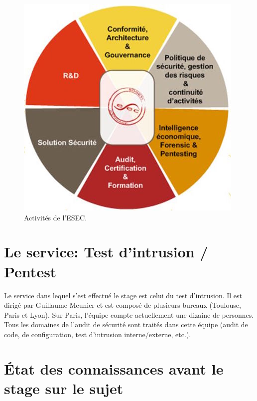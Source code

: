 \begin{figure}[h]
    \centering
    \includegraphics[scale=0.5]{activities.jpg}
    \caption{Activités de l'ESEC.}
\end{figure}

\section*{Le service: Test d'intrusion / Pentest}
Le service dans lequel s'est effectué le stage est celui du test d'intrusion. Il est dirigé par Guillaume Meunier et est composé
de plusieurs bureaux (Toulouse, Paris et Lyon). Sur Paris, l'équipe compte actuellement une dizaine de personnes. Tous les domaines de l'audit de
sécurité sont traités dans cette équipe (audit de code, de configuration, test d'intrusion interne/externe, etc.).

\subparagraph{}

\section*{État des connaissances avant le stage sur le sujet}
